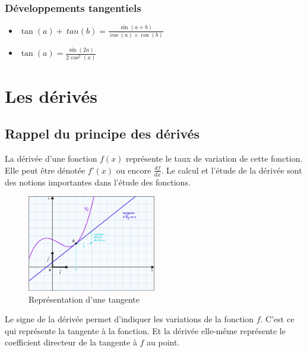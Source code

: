 \documentclass[12]{article}%
\theoremstyle{plain}
\theoremstyle{definition}
\theoremstyle{remark}
\begin{document}
\subsubsection{Développements tangentiels}
\begin{itemize}
	\item \( \boxed{\tan(a) + \ tan(b) = \frac{\sin(a+b)}{\cos(a) \times \cos(b)}} \)
	\item \( \boxed{\tan(a) = \frac{\sin(2a)}{2\cos^{2}(a)}} \)
\end{itemize}

\newpage
\section{Les dérivés}
\subsection{Rappel du principe des dérivés}
La dérivée d’une fonction $f(x)$ représente le taux de variation de cette fonction. Elle peut être dénotée $f’(x)$ ou encore $\frac{df}{dx}$. Le calcul et l’étude de la dérivée sont des notions importantes dans l’étude des fonctions.

\begin{figure}[h] %
	\centering
	\includegraphics[width=0.5\textwidth]{./images/tangente.png} %
	\caption{Représentation d'une tangente}
	\label{fig:tangente} %
\end{figure}

Le signe de la dérivée permet d’indiquer les variations de la fonction $f$. C’est ce qui représente la tangente à la fonction. Et la dérivée elle-même représente le coefficient directeur de la tangente à $f$ au point. \newline
\end{document}
